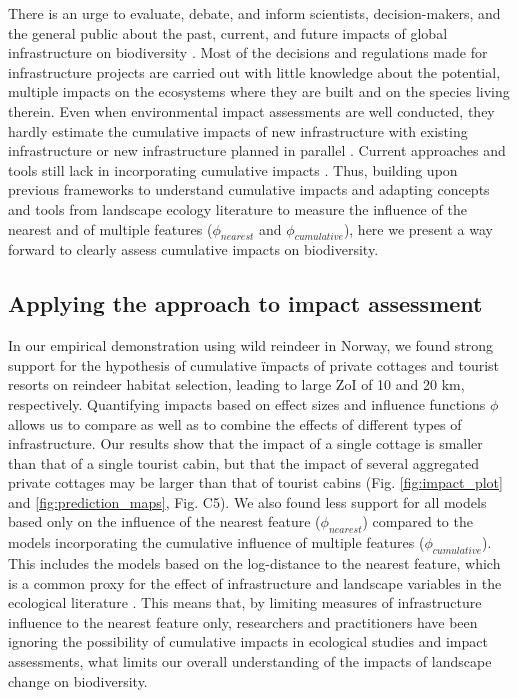 \documentclass[titlepage]{article}
\begin{document}
There is an urge to evaluate, debate, and inform scientists, decision-makers, and the general public about the past, current, and future impacts of global infrastructure on biodiversity \citep{laurance_conservation_2018}. Most of the decisions and regulations made for infrastructure projects are carried out with little knowledge about the potential, multiple impacts on the ecosystems where they are built and on the species living therein. Even when environmental impact assessments are well conducted, they hardly estimate the cumulative impacts of new infrastructure with existing infrastructure or new infrastructure planned in parallel \citep{laurance_roads_2017, johnson_regulating_2011}. Current approaches and tools still lack in incorporating cumulative impacts \citep[but see][for recent advances]{gillingham_integration_2016}. Thus, building upon previous frameworks to understand cumulative impacts \citep{naugle_unifying_2011} and adapting concepts and tools from landscape ecology literature to measure the influence of the nearest and of multiple features ($\phi_{nearest}$ and $\phi_{cumulative}$), here we present a way forward to clearly assess cumulative impacts on biodiversity. 

\subsection{Applying the approach to impact assessment}

In our empirical demonstration using wild reindeer in Norway, we found strong support for the hypothesis of cumulative ïmpacts of private cottages and tourist resorts on reindeer habitat selection, leading to large ZoI of 10 and 20 km, respectively. Quantifying impacts based on effect sizes and influence functions $\phi$ allows us to compare as well as to combine the effects of different types of infrastructure. Our results show that the impact of a single cottage is smaller than that of a single tourist cabin, but that the impact of several aggregated private cottages may be larger than that of tourist cabins (Fig. \ref{fig:impact_plot} and \ref{fig:prediction_maps}, Fig. C5). We also found less support for all models based only on the influence of the nearest feature ($\phi_{nearest}$) compared to the models incorporating the cumulative influence of multiple features ($\phi_{cumulative}$). This includes the models based on the log-distance to the nearest feature, which is a common proxy for the effect of infrastructure and landscape variables in the ecological literature \citep[e.g.][]{torres_assessing_2016,polfus_identifying_2011}. This means that, by limiting measures of infrastructure influence to the nearest feature only, researchers and practitioners have been ignoring the possibility of cumulative impacts in ecological studies and impact assessments, what limits our overall understanding of the impacts of landscape change on biodiversity.
\end{document}
